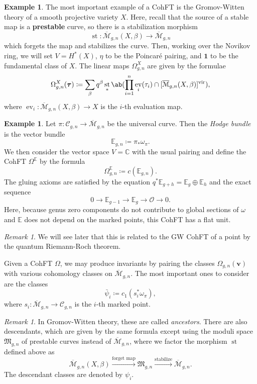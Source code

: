 \documentclass[10pt]{amsart}
\theoremstyle{definition}
\newtheorem{exm}[thm]{Example}
\theoremstyle{remark}
\newtheorem{rmk}[thm]{Remark}
\theoremstyle{plain}
\theoremstyle{definition}
\theoremstyle{remark}
\newcommand{\C}{\mathbb{C}}
\newcommand{\E}{\mathbb{E}}
\newcommand{\Mbar}{\overline{\mathcal{M}}}
\newcommand{\mc}[1]{\mathcal{#1}}
\newcommand{\mf}[1]{\mathfrak{#1}}
\newcommand{\mbf}[1]{\mathbf{#1}}
\newcommand{\bv}{\mbf{v}}
\newcommand{\btau}{\bm{\tau}}
\newcommand{\mr}[1]{\mathrm{#1}}
\newcommand{\1}{\mathbf{1}}
\newcommand{\2}{\mathbf{2}}
\newcommand{\3}{\mathbf{3}}
\newcommand{\vir}{\mr{vir}}
\DeclareMathOperator{\ev}{ev}
\DeclareMathOperator{\st}{st}
\begin{document}
\begin{exm}
    The most important example of a CohFT is the Gromov-Witten theory of a smooth projective variety $X$. Here, recall that the source of a stable map is a \textbf{prestable} curve, so there is a stabilization morphism
    \[ \st \colon \Mbar_{g,n}(X,\beta) \to \Mbar_{g,n} \]
    which forgets the map and stabilizes the curve. Then, working over the Novikov ring, we will set $V = H^*(X)$, $\eta$ to be the Poincar\'e pairing, and $\1$ to be the fundamental class of $X$. The linear maps $\Omega^X_{g,n}$ are given by the formulae
    \[ \Omega_{g,n}^X(\btau) \coloneqq \sum_{\beta} q^{\beta} \st_* \ab(\prod_{i=1}^n \ev_i(\tau_i) \cap [\Mbar_{g,n}(X,\beta)]^{\vir}), \]
    where $\ev_i \colon \Mbar_{g,n}(X,\beta) \to X$ is the $i$-th evaluation map.
\end{exm}

\begin{exm}
    Let $\pi \colon \mc{C}_{g,n} \to \Mbar_{g,n}$ be the universal curve. Then the \textit{Hodge bundle} is the vector bundle 
    \[ \E_{g,n} \coloneqq \pi_* \omega_{\pi}. \]
    We then consider the vector space $V = \C$ with the usual pairing and define the CohFT $\Omega^{\E}$ by the formula
    \[ \Omega^{\E}_{g,n} \coloneqq c(\E_{g,n}). \]
    The gluing axioms are satisfied by the equation $q^* \E_{g+h} = \E_g \oplus \E_h$ and the exact sequence
    \[ 0 \to \E_{g-1} \to \E_g \to \mc{O} \to 0. \]
    Here, because genus zero components do not contribute to global sections of $\omega$ and $\E$ does not depend on the marked points, this CohFT has a flat unit.
\end{exm}

\begin{rmk}
    We will see later that this is related to the GW CohFT of a point by the quantum Riemann-Roch theorem. 
\end{rmk}

Given a CohFT $\Omega$, we may produce invariants by pairing the classes $\Omega_{g,n}(\bv)$ with various cohomology classes on $\Mbar_{g,n}$. The most important ones to consider are the classes
\[ \bar{\psi}_i \coloneqq c_1( s_i^* \omega_{\pi} ), \]
where $s_i \colon \Mbar_{g,n} \to \mc{C}_{g,n}$ is the $i$-th marked point.

\begin{rmk}
    In Gromov-Witten theory, these are called \textit{ancestors}. There are also descendants, which are given by the same formula except using the moduli space $\mf{M}_{g,n}$ of prestable curves instead of $\Mbar_{g,n}$, where we factor the morphism $\st$ defined above as
    \[ \Mbar_{g,n}(X,\beta) \xrightarrow{\text{forget map}} \mf{M}_{g,n} \xrightarrow{\text{stabilize}} \Mbar_{g,n}. \]
    The descendant classes are denoted by $\psi_i$.
\end{rmk}
\end{document}
